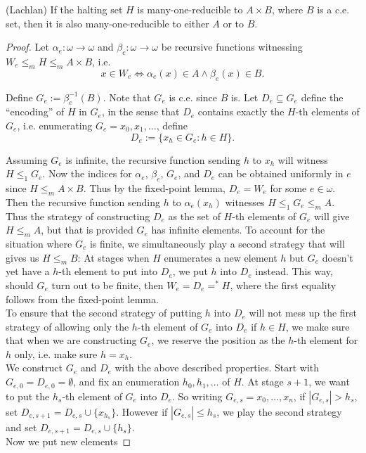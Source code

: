 \begin{theorem}
  (Lachlan) If the halting set $H$ is many-one-reducible to $A\times B$,
  where $B$ is a c.e. set, then it is also many-one-reducible to either $A$
  or to $B$.
\end{theorem}
\begin{proof}
  Let $\alpha_e:\omega \rightarrow\omega$ and $\beta_e:\omega
  \rightarrow\omega$ be recursive functions witnessing $W_e\leq_m H\leq_m
  A\times B$, i.e.
  \[x\in W_e \Leftrightarrow \alpha_e(x)\in A \wedge \beta_e(x)\in B.\]

  Define $G_e:=\beta_e^{-1}(B)$. Note that $G_e$ is c.e. since $B$ is. Let
  $D_e\subseteq G_e$ define the ``encoding'' of $H$ in $G_e$, in the sense
  that $D_e$ contains exactly the $H$-th elements of $G_e$, i.e.
  enumerating $G_e = x_0,x_1,\ldots$, define
  \[D_e :=\{x_h\in G_e: h\in H\}.\]

  Assuming $G_e$ is infinite, the recursive function sending $h$ to
  $x_h$ will witness $H\leq_1G_e$. Now the indices for $\alpha_e$,
  $\beta_e$, $G_e$, and $D_e$ can be obtained uniformly in $e$ since
  $H\leq_m A\times B$. Thus by the fixed-point lemma, $D_e=W_e$ for some
  $e\in\omega$. Then the recursive function sending $h$ to $\alpha_e(x_h)$
  witnesses $H\leq_1 G_e\leq_m A$.\\

  Thus the strategy of constructing $D_e$ as the set of $H$-th elements of
  $G_e$ will give $H\leq_m A$, but that is provided $G_e$ has infinite
  elements. To account for the situation where $G_e$ is finite, we
  simultaneously play a second strategy that will gives us $H\leq_m B$: At
  stages when $H$ enumerates a new element $h$ but $G_e$ doesn't yet have
  a $h$-th element to put into $D_e$, we put $h$ into $D_e$ instead.
  This way, should $G_e$ turn out to be finite, then $W_e=D_e=^*H$, where
  the first equality follows from the fixed-point lemma. 
  \\

  To ensure that the second strategy of putting $h$ into $D_e$ will not
  mess up the first strategy of allowing only the $h$-th element of $G_e$
  into $D_e$ if $h\in H$, we make sure that when we are constructing $G_e$,
  we reserve the position as the $h$-th element for $h$ only, i.e. make
  sure $h=x_h$.\\

  We construct $G_e$ and $D_e$ with the above described properties. Start
  with $G_{e,0}=D_{e,0}=\emptyset$, and fix an enumeration $h_0,h_1,\ldots$
  of $H$. At stage $s+1$, we want to put the $h_s$-th element of $G_e$
  into $D_e$. So writing $G_{e,s}=x_0,\ldots,x_n$, if $|G_{e,s}|>h_s$, set
  $D_{e,s+1} =D_{e,s} \cup \{x_{h_s}\}$. However if $|G_{e,s}|\leq h_s$, we
  play the second strategy and set $D_{e,s+1} =D_{e,s} \cup \{h_s\}$.\\

  Now we put new elements
\end{proof}
